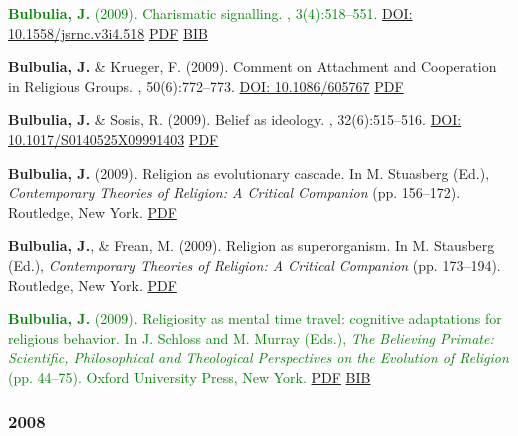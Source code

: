 \documentclass{article}
\begin{document}
\begin{thebibliography}{99}
\textcolor{Green}{
{\bf Bulbulia, J.} (2009).
\newblock Charismatic signalling.
,
  3(4):518--551.} \newblock 
\href{https://doi.org/10.1558/jsrnc.v3i4.518}{DOI: 10.1558/jsrnc.v3i4.518} \newblock \href{http://db.tt/8IiltRr}{PDF} \href{https://scholar.google.co.nz/scholar.bib?q=info:eUGNRtbVR88J:scholar.google.com/&output=citation&scisig=AAGBfm0AAAAAVQPSkHpPrfY5B1nrjrJcYvQiHbdtIIuQ&scisf=4&hl=en}{BIB}


{\bf Bulbulia, J.} \& Krueger, F. (2009). Comment on Attachment and Cooperation in Religious Groups.
\newblock 
{}, 50(6):772--773.
\href{https://doi.org/10.1086/605767}{DOI: 10.1086/605767} \newblock \href{http://db.tt/MMaLhwQ}{PDF}


{\bf Bulbulia, J.} \& Sosis, R. (2009).
\newblock Belief as ideology.
, 32(6):515--516. 
\href{https://doi.org/10.1017/S0140525X09991403}{DOI: 10.1017/S0140525X09991403} \newblock \href{http://db.tt/I9z2SCY}{PDF}


{\bf Bulbulia, J.} (2009).
\newblock Religion as evolutionary cascade.
\newblock In M. Stuasberg (Ed.), {\em Contemporary Theories of Religion: A
  Critical Companion} (pp. 156--172). Routledge, New York. \href{http://db.tt/OLFGqFk}{PDF}


{\bf Bulbulia, J.}, \& Frean, M. (2009).
\newblock Religion as superorganism.
\newblock In M. Stausberg (Ed.), {\em Contemporary Theories of Religion: A
  Critical Companion} (pp. 173--194). Routledge, New York. \href{http://db.tt/LMShwLD}{PDF}


\textcolor{Green}{{\bf Bulbulia, J.} (2009).
\newblock Religiosity as mental time travel: cognitive adaptations for
  religious behavior.
\newblock In J. Schloss and M. Murray (Eds.), {\em The Believing Primate:
  Scientific, Philosophical and Theological Perspectives on the Evolution of
  Religion} (pp. 44--75). Oxford University Press, New York. } \href{http://db.tt/gGUysok}{PDF} \href{https://www.dropbox.com/s/ri6hs7gbut6ku1f/2009.mentalTime.bib?dl=0}{BIB}



\subsubsection*{2008}





\end{thebibliography}
\end{document}
